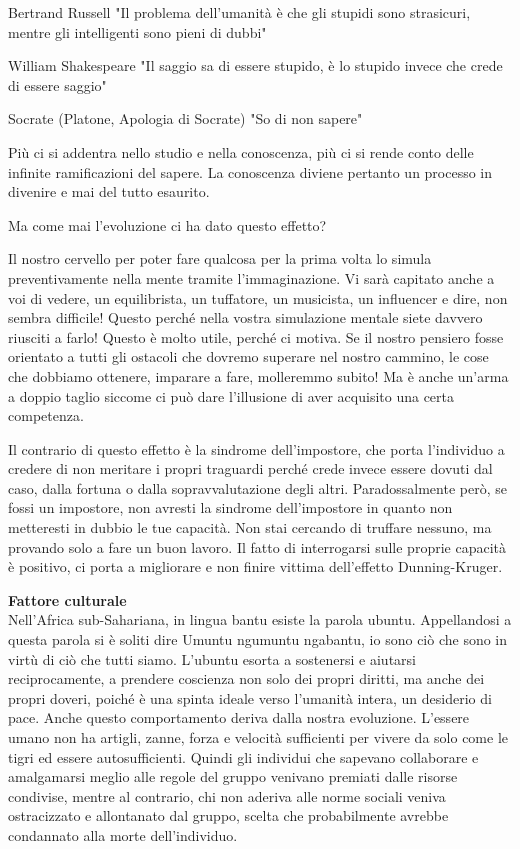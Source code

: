 \documentclass[12pt]{book} %
\begin{document}
Bertrand Russell "Il problema dell'umanità è che gli stupidi sono strasicuri,
mentre gli intelligenti sono pieni di dubbi"

William Shakespeare "Il saggio sa di essere stupido, è lo stupido invece che crede di essere
saggio"

Socrate (Platone, Apologia di Socrate) "So di non sapere"


\bigskip

Più ci si addentra nello studio e nella conoscenza, più ci si rende conto delle infinite ramificazioni del sapere. La
conoscenza diviene pertanto un processo in divenire e mai del tutto esaurito. 


\bigskip

Ma come mai l'evoluzione ci ha dato questo effetto? 

Il nostro cervello per poter fare qualcosa per la prima volta lo simula preventivamente nella mente tramite
l'immaginazione. Vi sarà capitato anche a voi di vedere, un equilibrista, un tuffatore, un
musicista, un influencer e dire, non sembra difficile! Questo perché nella vostra simulazione mentale siete davvero
riusciti a farlo! Questo è molto utile, perché ci motiva. Se il nostro pensiero fosse orientato a tutti gli ostacoli
che dovremo superare nel nostro cammino, le cose che dobbiamo ottenere, imparare a fare, molleremmo subito! Ma è anche
un'arma a doppio taglio siccome ci può dare l'illusione di aver acquisito una
certa competenza.


\bigskip

Il contrario di questo effetto è la sindrome dell'impostore, che porta
l'individuo a credere di non meritare i propri traguardi perché crede invece essere dovuti dal
caso, dalla fortuna o dalla sopravvalutazione degli altri. Paradossalmente però, se fossi un impostore, non avresti la
sindrome dell'impostore in quanto non metteresti in dubbio le tue capacità. Non stai cercando di
truffare nessuno, ma provando solo a fare un buon lavoro. Il fatto di interrogarsi sulle proprie capacità è positivo,
ci porta a migliorare e non finire vittima dell'effetto Dunning-Kruger.


\bigskip

\noindent \textbf{\large Fattore culturale} \\
Nell'Africa sub-Sahariana, in lingua bantu esiste la parola ubuntu. Appellandosi a questa parola si è soliti dire Umuntu
ngumuntu ngabantu, {\textquotedbl}io sono ciò che sono in virtù di ciò che tutti siamo{\textquotedbl}. L'ubuntu esorta
a sostenersi e aiutarsi reciprocamente, a prendere coscienza non solo dei propri diritti, ma anche dei propri doveri,
poiché è una spinta ideale verso l'umanità intera, un desiderio di
pace. Anche questo comportamento deriva dalla nostra
evoluzione. L'essere umano non ha artigli, zanne, forza e velocità sufficienti per vivere da solo
come le tigri ed essere autosufficienti. Quindi gli individui che sapevano collaborare e amalgamarsi meglio alle regole
del gruppo venivano premiati dalle risorse condivise, mentre al contrario, chi non aderiva alle norme sociali veniva
ostracizzato e allontanato dal gruppo, scelta che probabilmente avrebbe condannato alla morte
dell'individuo. 
\end{document}
